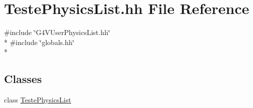 \hypertarget{_teste_physics_list_8hh}{\section{Teste\-Physics\-List.\-hh File Reference}
\label{_teste_physics_list_8hh}
}
{\ttfamily \#include \char`\"{}G4\-V\-User\-Physics\-List.\-hh\char`\"{}}\\*
{\ttfamily \#include \char`\"{}globals.\-hh\char`\"{}}\\*
\subsection*{Classes}
\begin{DoxyCompactItemize}
\item 
class \hyperlink{class_teste_physics_list}{Teste\-Physics\-List}
\end{DoxyCompactItemize}
